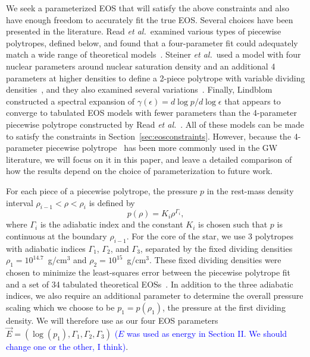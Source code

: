 \documentclass[twocolumn,prd,amssymb,aps,nofootinbib,showpacs,epsf]{revtex4}
\newcommand\les[2]{\textcolor{blue}{{#1}\sout{#2}}}
\begin{document}
We seek a parameterized EOS that will satisfy the above constraints and also have enough freedom to accurately fit the true EOS. Several choices have been presented in the literature. Read {\it et al.}\ examined various types of piecewise polytropes, defined below, and found that a four-parameter fit could adequately match a wide range of theoretical models~\cite{ReadLackey2009}. Steiner {\it et al.}\ used a model with four nuclear parameters around nuclear saturation density and an additional 4 parameters at higher densities to define a 2-piece polytrope with variable dividing densities~\cite{SteinerLattimerBrown2010}, and they also examined several variations~\cite{SteinerLattimerBrown2013}. Finally, Lindblom constructed a spectral expansion of $\gamma(\epsilon) = d\log p / d\log \epsilon$ that appears to converge to tabulated EOS models with fewer parameters than the 4-parameter piecewise polytrope constructed by Read {\it et al.}~\cite{Lindblom2010}. All of these models can be made to satisfy the constraints in Section~\ref{sec:eosconstraints}. However, because the 4-parameter piecewise polytrope~\cite{ReadLackey2009} has been more commonly used in the GW literature, we will focus on it in this paper, and leave a detailed comparison of how the results depend on the choice of parameterization to future work.

For each piece of a piecewise polytrope, the pressure $p$ in the rest-mass density interval $\rho_{i-1} < \rho < \rho_i$ is defined by
\begin{equation}
p(\rho) = K_i \rho^{\Gamma_i},
\end{equation}
where $\Gamma_i$ is the adiabatic index and the constant $K_i$ is chosen such that $p$ is continuous at the boundary $\rho_{i-1}$. For the core of the star, we use 3 polytropes with adiabatic indices $\Gamma_1$, $\Gamma_2$, and $\Gamma_3$, separated by the fixed dividing densities $\rho_1 = 10^{14.7}$~g/cm$^3$ and $\rho_2 = 10^{15}$~g/cm$^3$. These fixed dividing densities were chosen to minimize the least-squares error between the piecewise polytrope fit and a set of 34 tabulated theoretical EOSs~\cite{ReadLackey2009}. In addition to the three adiabatic indices, we also require an additional parameter to determine the overall pressure scaling which we choose to be $p_1 = p(\rho_1)$, the pressure at the first dividing density. We will therefore use as our four EOS parameters $\vec E = (\log(p_1), \Gamma_1, \Gamma_2, \Gamma_3)$ \les{($E$ was used as energy in Section II.  We should change one or the other, I think)}{}.
\end{document}

